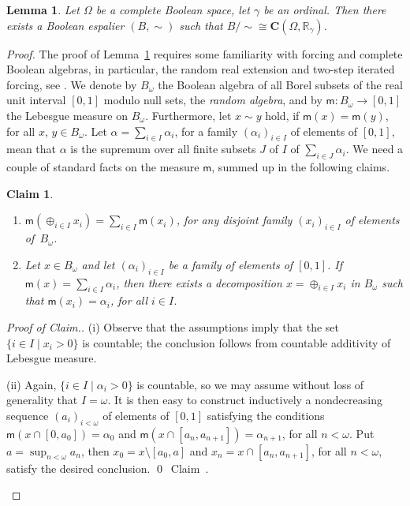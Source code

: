 \documentclass[psamsfonts,reqno]{memo-l}
\theoremstyle{plain}
\newtheorem{lemma}{Lemma}[section]
\newtheorem{claim}{Claim}
\theoremstyle{definition}
\theoremstyle{remark}
\newcommand{\qedc}{{\qed}~{\rm Claim~{\theclaim}.}}
\newenvironment{cproof}
{\begin{proof}[Proof of Claim.]}
{\qedc\renewcommand{\qed}{}\end{proof}}
\numberwithin{equation}{section}
\newcommand{\CC}{\mathbf{C}}
\newcommand{\mm}{\mathsf{m}}
\newcommand{\Bo}{B_{\omega}}
\newcommand{\RR}{\mathbb{R}}
\newcommand{\set}[1]{\{#1\}}
\newcommand{\setm}[2]{\set{#1\mid#2}}
\begin{document}
\begin{lemma}\label{L:LotsofII}
Let $\Omega$ be a complete Boolean
space, let $\gamma$ be an ordinal. Then there exists a
Boolean espalier
$(B,\sim)$ such that $B/{\sim}\cong\CC(\Omega,\RR_\gamma)$.
\index{Rzzgamma@$\RR_\gamma$}
\end{lemma}

\begin{proof}
The proof of Lemma~\ref{L:LotsofII} requires some familiarity with
forcing and
 complete Boolean algebras, in
particular, the random real extension and two-step iterated forcing, see
\cite{Jech78}. We denote by $\Bo$\index{Bzzo@$\Bo$|ii}
the Boolean algebra of all Borel subsets
of the real unit interval $[0,1]$ modulo null sets, the \emph{random
algebra},
and by $\mm\colon\Bo\to[0,1]$ the Lebesgue measure on $\Bo$.
Furthermore, let $x\sim y$ hold, if $\mm(x)=\mm(y)$, for all $x$, $y\in\Bo$.
Let $\alpha=\sum_{i\in I}\alpha_i$, for a family $(\alpha_i)_{i\in I}$ of
elements of $[0,1]$, mean that $\alpha$ is the supremum over all finite
subsets $J$ of $I$ of $\sum_{i\in J}\alpha_i$.
We need a couple of standard facts on the measure $\mm$, summed up in the
following claims.
\goodbreak

\setcounter{claim}{0}
\begin{claim}\label{Cl:1}\hfill
\begin{enumerate}
\item $\mm(\oplus_{i\in I}x_i)=\sum_{i\in I}\mm(x_i)$, for any disjoint
family $(x_i)_{i\in I}$ of elements of~$\Bo$.

\item Let $x\in\Bo$ and let $(\alpha_i)_{i\in I}$ be a family of elements of
$[0,1]$. If $\mm(x)=\sum_{i\in I}\alpha_i$, then there exists a decomposition
$x=\oplus_{i\in I}x_i$ in $\Bo$ such that $\mm(x_i)=\alpha_i$, for all
$i\in I$.
\end{enumerate}
\end{claim}

\begin{cproof}
(i) Observe that the assumptions imply that the set $\setm{i\in I}{x_i>0}$ is
countable; the conclusion follows from countable additivity of Lebesgue
measure.

(ii) Again, $\setm{i\in I}{\alpha_i>0}$ is countable, so we may assume
without loss of generality that $I=\omega$. It is then easy to construct
inductively a nondecreasing sequence $(a_i)_{i<\omega}$ of elements of
$[0,1]$ satisfying the conditions $\mm(x\cap[0,a_0])=\alpha_0$ and
$\mm(x\cap[a_n,a_{n+1}])=\alpha_{n+1}$, for all $n<\omega$. Put
$a=\sup_{n<\omega}a_n$, then $x_0=x\setminus[a_0,a]$ and
$x_n=x\cap[a_n,a_{n+1}]$, for all $n<\omega$, satisfy the desired conclusion.
\end{cproof}


\end{proof}
\end{document}
